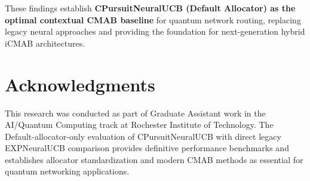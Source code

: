 \documentclass[12pt,a4paper]{article}
\newcommand{\success}[1]{\textcolor{accentgreen}{\textbf{#1}}}
\begin{document}
These findings establish \success{\textbf{CPursuitNeuralUCB (Default Allocator) as the optimal contextual CMAB baseline}} for quantum network routing, replacing legacy neural approaches and providing the foundation for next-generation hybrid iCMAB architectures.

\section{Acknowledgments}

This research was conducted as part of Graduate Assistant work in the AI/Quantum Computing track at Rochester Institute of Technology. The Default-allocator-only evaluation of CPursuitNeuralUCB with direct legacy EXPNeuralUCB comparison provides definitive performance benchmarks and establishes allocator standardization and modern CMAB methods as essential for quantum networking applications.
\end{document}
